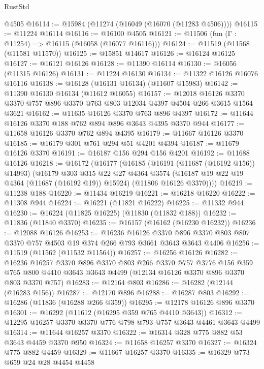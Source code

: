\begin{lexlean}{RustStd}
\begin{coremodule}
    @4505
@16114 := @15984 (@11274 (@16049 (@16070 (@11283 @4506))))
@16115 := @11224 @16114
@16116 := @16100 @4505
@16121 := @11506 (fun (Γ : @11254) => @16115 (@16058 (@16077 @16116)))
@16124 := @11519 (@11568 (@11581 @11570))
@16125 := @15851 @14617
@16126 := @16124 @16125
@16127 := @16121 @16126
@16128 := @11390 @16114
@16130 := @16056 (@11315 @16126)
@16131 := @11224 @16130
@16134 := @11322 @16126 @16076 @16116
@16138 := @16128 (@16131 @16134) (@11607 @15983)
@16142 := @11390 @16130 @16134 (@11612 @16055)
@16157 := @12018
    @16126
    @3370
    @3370
    @757
    @896
    @3370
    @763
    @803
    @12034
    @4397
    @4504
    @266
    @3615
    @1564
    @3621
@16162 := @11635 @16126 @3370 @763 @896 @4397
@16172 := @11644 @16126 @3370 @188 @762 @894 @896 @3643 @4395 @3370 @944
@16177 := @11658 @16126 @3370 @762 @894 @4395
@16179 := @11667 @16126 @3370
@16185 := @16179 @301 @761 @294 @51 @4201 @4394
@16187 := @11679 @16126 @3370
@16191 := @16187 @156 @294 @156 @4201
@16192 := @11688 @16126
@16218 := @16172
    (@16177
      (@16185
        (@16191 (@11687 (@16192 @156)) @14993)
        (@16179
          @303
          @315
          @22
          @27
          @4364
          @3574
          (@16187 @19 @22 @19 @4364 (@11687 (@16192 @19)) @15924)
          (@11806 @16126 @3370))))
@16219 := @11238 @188
@16220 := @11434 @16219
@16221 := @16218 @16220
@16222 := @11308 @944
@16224 := @16221 (@11821 @16222)
@16225 := @11332 @944
@16230 := @16224 (@11825 @16225) (@11830 (@11832 @188))
@16232 := @11836 (@11840 @3370)
@16235 := @16157 (@16162 (@16230 @16232))
@16236 := @12088 @16126
@16253 := @16236
    @16126
    @3370
    @896
    @3370
    @803
    @807
    @3370
    @757
    @4503
    @19
    @374
    @266
    @793
    @3661
    @3643
    @3643
    @4406
@16256 := @11519 (@11562 (@11532 @11564))
@16257 := @16256 @16126
@16282 := @16236
    @16257
    @3370
    @896
    @3370
    @803
    @266
    @3370
    @757
    @3776
    @156
    @359
    @765
    @800
    @4410
    @3643
    @3643
    @4499
    (@12134 @16126 @3370 @896 @3370 @803 @3370 @757)
@16283 := @12164 @803
@16286 := @16282 (@12144 (@16283 @156))
@16287 := @12170 @896
@16288 := @16287 @803
@16292 := @16286 (@11836 (@16288 @266 @359))
@16295 := @12178 @16126 @896 @3370
@16301 := @16292 (@11612 (@16295 @359 @765 @4410 @3643))
@16312 := @12295 @16257 @3370 @3370 @776 @798 @793 @757 @3643 @4461 @3643 @4499
@16314 := @11644 @16257 @3370
@16322 := @16314 @328 @775 @882 @53 @3643 @4459 @3370 @950
@16324 := @11658 @16257 @3370
@16327 := @16324 @775 @882 @4459
@16329 := @11667 @16257 @3370
@16335 := @16329 @773 @659 @24 @28 @4454 @4458

\end{coremodule}
\end{lexlean}
